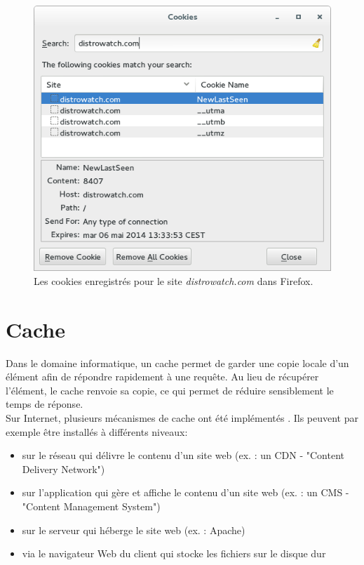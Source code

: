 \begin{figure}[h]
	\centering
	\includegraphics[scale=0.75]{figures/cookies_distrowatch.png}
	\caption{\label{cookies_distrowatch}Les cookies enregistrés pour le site \textit{distrowatch.com} dans Firefox.}
\end{figure}

\section{Cache}
\label{http-cache-expl}
Dans le domaine informatique, un cache permet de garder une copie locale d'un élément afin de répondre rapidement à une requête. Au lieu de récupérer l'élément, le cache renvoie sa copie, ce qui permet de réduire sensiblement le temps de réponse.\\
Sur Internet, plusieurs mécanismes de cache ont été implémentés \cite{WikipediaEN_Web_cache}. Ils peuvent par exemple être installés à différents niveaux:

\begin{itemize}
  \item sur le réseau qui délivre le contenu d'un site web (ex. : un CDN - "Content Delivery Network")
  \item sur l'application qui gère et affiche le contenu d'un site web (ex. : un CMS - "Content Management System")
  \item sur le serveur qui héberge le site web (ex. : Apache)
  \item via le navigateur Web du client qui stocke les fichiers sur le disque dur
  \newline
\end{itemize}

